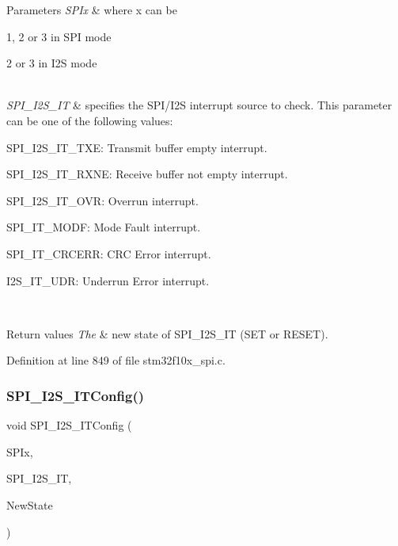 \begin{DoxyParams}{Parameters}
{\em S\+P\+Ix} & where x can be
\begin{DoxyItemize}
\item 1, 2 or 3 in S\+PI mode
\item 2 or 3 in I2S mode 
\end{DoxyItemize}\\
\hline
{\em S\+P\+I\+\_\+\+I2\+S\+\_\+\+IT} & specifies the S\+P\+I/\+I2S interrupt source to check. This parameter can be one of the following values\+: \begin{DoxyItemize}
\item S\+P\+I\+\_\+\+I2\+S\+\_\+\+I\+T\+\_\+\+T\+XE\+: Transmit buffer empty interrupt. \item S\+P\+I\+\_\+\+I2\+S\+\_\+\+I\+T\+\_\+\+R\+X\+NE\+: Receive buffer not empty interrupt. \item S\+P\+I\+\_\+\+I2\+S\+\_\+\+I\+T\+\_\+\+O\+VR\+: Overrun interrupt. \item S\+P\+I\+\_\+\+I\+T\+\_\+\+M\+O\+DF\+: Mode Fault interrupt. \item S\+P\+I\+\_\+\+I\+T\+\_\+\+C\+R\+C\+E\+RR\+: C\+RC Error interrupt. \item I2\+S\+\_\+\+I\+T\+\_\+\+U\+DR\+: Underrun Error interrupt. \end{DoxyItemize}
\\
\hline
\end{DoxyParams}

\begin{DoxyRetVals}{Return values}
{\em The} & new state of S\+P\+I\+\_\+\+I2\+S\+\_\+\+IT (S\+ET or R\+E\+S\+ET). \\
\hline
\end{DoxyRetVals}


Definition at line 849 of file stm32f10x\+\_\+spi.\+c.

\mbox{\label{group___s_p_i___private___functions_ga17f4ef132e8ddbf94cb6b1688d181e41}} 
\subsubsection{\texorpdfstring{S\+P\+I\+\_\+\+I2\+S\+\_\+\+I\+T\+Config()}{SPI\_I2S\_ITConfig()}}
{\footnotesize\ttfamily void S\+P\+I\+\_\+\+I2\+S\+\_\+\+I\+T\+Config (\begin{DoxyParamCaption}\item[{\hyperlink{struct_s_p_i___type_def}{S\+P\+I\+\_\+\+Type\+Def} $\ast$}]{S\+P\+Ix,  }\item[{uint8\+\_\+t}]{S\+P\+I\+\_\+\+I2\+S\+\_\+\+IT,  }\item[{\hyperlink{group___exported__types_gac9a7e9a35d2513ec15c3b537aaa4fba1}{Functional\+State}}]{New\+State }\end{DoxyParamCaption})}



